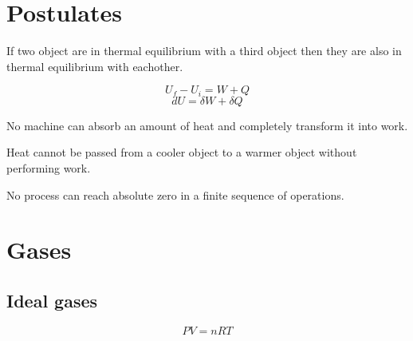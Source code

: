	\section{Postulates}
		\begin{theorem}
        	If two object are in thermal equilibrium with a third object then they are also in thermal equilibrium with eachother.
        \end{theorem}
        \begin{theorem}
        	\begin{equation}
				\label{thermo:first_law}
                U_f - U_i = W + Q
			\end{equation}
        	\begin{equation}
            	\label{thermo:first_law_differential}
                dU = \delta W + \delta Q
			\end{equation}
		\end{theorem}
        
        \begin{theorem}
        	No machine can absorb an amount of heat and completely transform it into work.
		\end{theorem}
        \begin{theorem}
			Heat cannot be passed from a cooler object to a warmer object without performing work.
		\end{theorem}
        
        \begin{theorem}
        	No process can reach absolute zero in a finite sequence of operations.
		\end{theorem}
	\section{Gases}
    	\subsection{Ideal gases}
        	\begin{theorem}
            	\begin{equation}
					\label{thermo:ideal_gas_law}
                    \boxed{PV = nRT}
				\end{equation}
            \end{theorem}